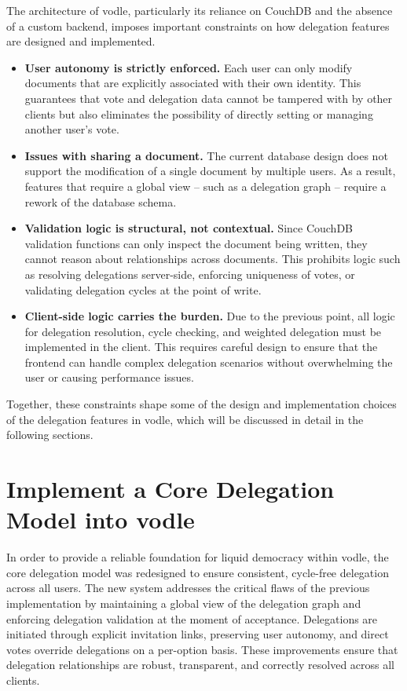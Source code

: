 The architecture of vodle, particularly its reliance on CouchDB and the absence of a custom backend, imposes important constraints on how delegation features are designed and implemented.

\begin{itemize}
  \item \textbf{User autonomy is strictly enforced.} Each user can only modify documents that are explicitly associated with their own identity. This guarantees that vote and delegation data cannot be tampered with by other clients but also eliminates the possibility of directly setting or managing another user's vote.

  \item \textbf{Issues with sharing a document.} The current database design does not support the modification of a single document by multiple users. As a result, features that require a global view -- such as a delegation graph -- require a rework of the database schema.

  \item \textbf{Validation logic is structural, not contextual.} Since CouchDB validation functions can only inspect the document being written, they cannot reason about relationships across documents. This prohibits logic such as resolving delegations server-side, enforcing uniqueness of votes, or validating delegation cycles at the point of write.

  \item \textbf{Client-side logic carries the burden.} Due to the previous point, all logic for delegation resolution, cycle checking, and weighted delegation must be implemented in the client. This requires careful design to ensure that the frontend can handle complex delegation scenarios without overwhelming the user or causing performance issues.
\end{itemize}

Together, these constraints shape some of the design and implementation choices of the delegation features in vodle, which will be discussed in detail in the following sections.

\section{Implement a Core Delegation Model into vodle}\label{sec:core_delegation_detailed}

In order to provide a reliable foundation for liquid democracy within vodle, the core delegation model was redesigned to ensure consistent, cycle-free delegation across all users. The new system addresses the critical flaws of the previous implementation by maintaining a global view of the delegation graph and enforcing delegation validation at the moment of acceptance. Delegations are initiated through explicit invitation links, preserving user autonomy, and direct votes override delegations on a per-option basis. These improvements ensure that delegation relationships are robust, transparent, and correctly resolved across all clients.


